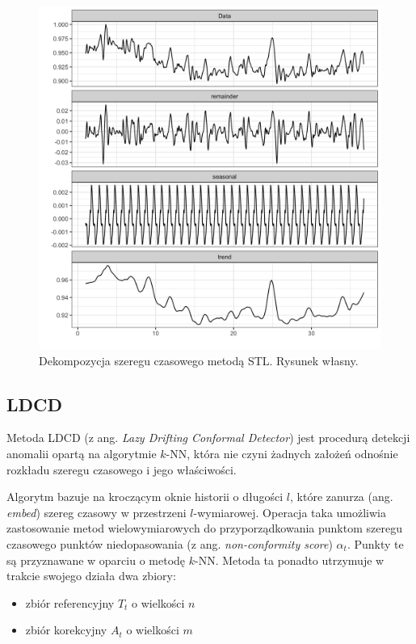 \documentclass{article}
\begin{document}
\begin{figure}[H]
\centering
\includegraphics[width=\textwidth]{./images/stl-usage.png}
\caption{Dekompozycja szeregu czasowego metodą STL. Rysunek własny.}
\end{figure}

\subsection{LDCD}

Metoda LDCD  (z ang. \emph{Lazy Drifting Conformal Detector}) \cite{knn} jest procedurą detekcji anomalii opartą
na algorytmie $k$-NN, która nie czyni żadnych założeń odnośnie rozkładu szeregu czasowego i jego właściwości.

Algorytm bazuje na kroczącym oknie historii o długości $l$, które zanurza (ang. \emph{embed}) szereg czasowy w przestrzeni $l$-wymiarowej.
Operacja taka umożliwia zastosowanie metod wielowymiarowych do przyporządkowania punktom szeregu czasowego punktów niedopasowania (z ang. \emph{non-conformity score}) $\alpha_{t}$. Punkty te są przyznawane w oparciu o metodę $k$-NN. 
Metoda ta ponadto utrzymuje w trakcie swojego działa dwa zbiory:

\begin{itemize}

  \item zbiór referencyjny $T_{t}$ o wielkości $n$
  \item zbiór korekcyjny $A_{t}$ o wielkości $m$ 

\end{itemize}
\end{document}
